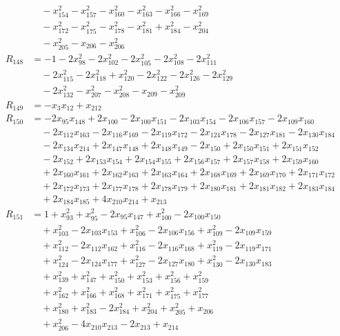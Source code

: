 \begin{align*}
&\quad{}-x_{154}^{2}-x_{157}^{2}-x_{160}^{2}-x_{163}^{2}-x_{166}^{2}-x_{169}^{2}\\
&\quad{}-x_{172}^{2}-x_{175}^{2}-x_{178}^{2}-x_{181}^{2}+x_{184}^{2}-x_{204}^{2}\\
&\quad{}-x_{205}^{2}-x_{206}-x_{206}^{2}\\
R_{148}&=-1-2x_{98}^{2}-2x_{102}^{2}-2x_{105}^{2}-2x_{108}^{2}-2x_{111}^{2}\\
&\quad{}-2x_{115}^{2}-2x_{118}^{2}+x_{120}^{2}-2x_{122}^{2}-2x_{126}^{2}-2x_{129}^{2}\\
&\quad{}-2x_{132}^{2}-x_{207}^{2}-x_{208}^{2}-x_{209}-x_{209}^{2}\\
R_{149}&=-x_{3}x_{12}+x_{212}\\
R_{150}&=-2x_{95}x_{148}+2x_{100}-2x_{100}x_{151}-2x_{103}x_{154}-2x_{106}x_{157}-2x_{109}x_{160}\\
&\quad{}-2x_{112}x_{163}-2x_{116}x_{169}-2x_{119}x_{172}-2x_{124}x_{178}-2x_{127}x_{181}-2x_{130}x_{184}\\
&\quad{}-2x_{134}x_{214}+2x_{147}x_{148}+2x_{148}x_{149}-2x_{150}+2x_{150}x_{151}+2x_{151}x_{152}\\
&\quad{}-2x_{152}+2x_{153}x_{154}+2x_{154}x_{155}+2x_{156}x_{157}+2x_{157}x_{158}+2x_{159}x_{160}\\
&\quad{}+2x_{160}x_{161}+2x_{162}x_{163}+2x_{163}x_{164}+2x_{168}x_{169}+2x_{169}x_{170}+2x_{171}x_{172}\\
&\quad{}+2x_{172}x_{173}+2x_{177}x_{178}+2x_{178}x_{179}+2x_{180}x_{181}+2x_{181}x_{182}+2x_{183}x_{184}\\
&\quad{}+2x_{184}x_{185}+4x_{210}x_{214}+x_{213}\\
R_{151}&=1+x_{93}^{2}+x_{95}^{2}-2x_{95}x_{147}+x_{100}^{2}-2x_{100}x_{150}\\
&\quad{}+x_{103}^{2}-2x_{103}x_{153}+x_{106}^{2}-2x_{106}x_{156}+x_{109}^{2}-2x_{109}x_{159}\\
&\quad{}+x_{112}^{2}-2x_{112}x_{162}+x_{116}^{2}-2x_{116}x_{168}+x_{119}^{2}-2x_{119}x_{171}\\
&\quad{}+x_{124}^{2}-2x_{124}x_{177}+x_{127}^{2}-2x_{127}x_{180}+x_{130}^{2}-2x_{130}x_{183}\\
&\quad{}+x_{139}^{2}+x_{147}^{2}+x_{150}^{2}+x_{153}^{2}+x_{156}^{2}+x_{159}^{2}\\
&\quad{}+x_{162}^{2}+x_{166}^{2}+x_{168}^{2}+x_{171}^{2}+x_{175}^{2}+x_{177}^{2}\\
&\quad{}+x_{180}^{2}+x_{183}^{2}-2x_{184}^{2}+x_{204}^{2}+x_{205}^{2}+x_{206}\\
&\quad{}+x_{206}^{2}-4x_{210}x_{213}-2x_{213}+x_{214}\\

\end{align*}
